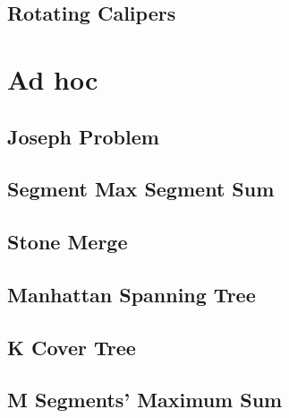 \documentclass[a4paper,10pt,twocolumn,oneside]{article}
\begin{document}
\subsection{Rotating Calipers}



\section{Ad hoc}

\subsection{Joseph Problem}


\subsection{Segment Max Segment Sum}


\subsection{Stone Merge}


\subsection{Manhattan Spanning Tree}


\subsection{K Cover Tree}


\subsection{M Segments' Maximum Sum}


%

%
\end{document}
